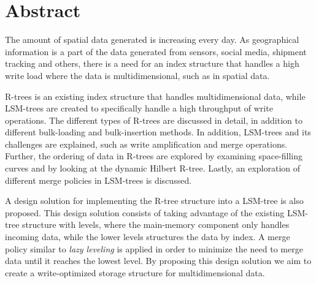 \chapter*{Abstract}
The amount of spatial data generated is increasing every day. As geographical information is a part of the data generated from sensors, social media, shipment tracking and others, there is a need for an index structure that handles a high write load where the data is multidimensional, such as in spatial data.\newline

\noindent
R-trees is an existing index structure that handles multidimensional data, while LSM-trees are created to specifically handle a high throughput of write operations. The different types of R-trees are discussed in detail, in addition to different bulk-loading and bulk-insertion methods. In addition, LSM-trees and its challenges are explained, such as write amplification and merge operations. Further, the ordering of data in R-trees are explored by examining space-filling curves and by looking at the dynamic Hilbert R-tree. Lastly, an exploration of different merge policies in LSM-trees is discussed.\newline

\noindent
A design solution for implementing the R-tree structure into a LSM-tree is also proposed. This design solution consists of taking advantage of the existing LSM-tree structure with levels, where the main-memory component only handles incoming data, while the lower levels structures the data by index. A merge policy similar to \emph{lazy leveling} is applied in order to minimize the need to merge data until it reaches the lowest level. By proposing this design solution we aim to create a write-optimized storage structure for multidimensional data. 
